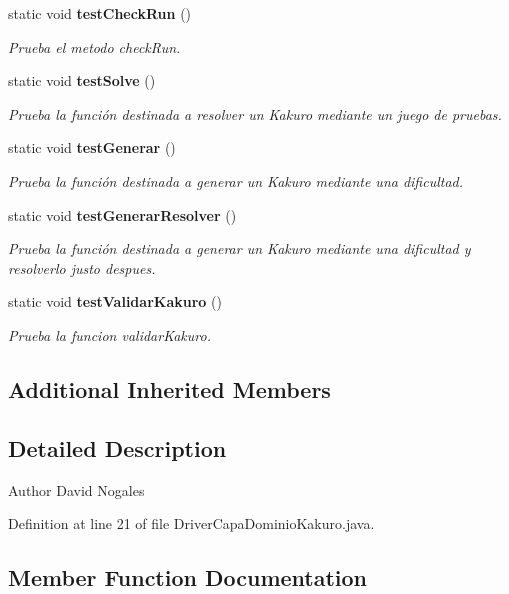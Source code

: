 \begin{DoxyCompactItemize}
static void \textbf{ test\+Check\+Run} ()
\begin{DoxyCompactList}\small\item\em Prueba el metodo check\+Run. \end{DoxyCompactList}\item 
static void \textbf{ test\+Solve} ()
\begin{DoxyCompactList}\small\item\em Prueba la función destinada a resolver un Kakuro mediante un juego de pruebas. \end{DoxyCompactList}\item 
static void \textbf{ test\+Generar} ()
\begin{DoxyCompactList}\small\item\em Prueba la función destinada a generar un Kakuro mediante una dificultad. \end{DoxyCompactList}\item 
static void \textbf{ test\+Generar\+Resolver} ()
\begin{DoxyCompactList}\small\item\em Prueba la función destinada a generar un Kakuro mediante una dificultad y resolverlo justo despues. \end{DoxyCompactList}\item 
static void \textbf{ test\+Validar\+Kakuro} ()
\begin{DoxyCompactList}\small\item\em Prueba la funcion validar\+Kakuro. \end{DoxyCompactList}\end{DoxyCompactItemize}
\subsection*{Additional Inherited Members}


\subsection{Detailed Description}
\begin{DoxyAuthor}{Author}
David Nogales 
\end{DoxyAuthor}


Definition at line 21 of file Driver\+Capa\+Dominio\+Kakuro.\+java.



\subsection{Member Function Documentation}
\mbox{\label{class_dominio_1_1controladores_1_1_drivers_1_1_driver_capa_dominio_kakuro_ac39d50ad7aea9aa181d385415da69acf}} 
